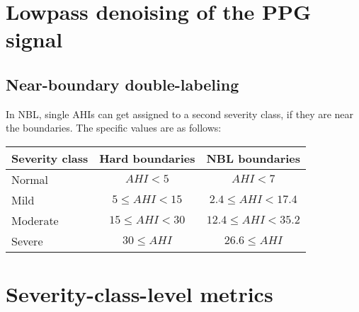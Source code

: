 \chapter{Lowpass denoising of the PPG signal}


\section{Near-boundary double-labeling}

In NBL, single AHIs can get assigned to a second severity class, if they are near the boundaries. The specific values are as follows:

\renewcommand{\arraystretch}{1.5}
\begin{table}[h!]
    \centering
    \begin{tabular}{ l c c }
        Severity class & Hard boundaries & NBL boundaries \\
        \hline
        Normal   & $ AHI < 5 $         & $ AHI < 7 $             \\
        Mild     & $ 5 \le AHI < 15 $  & $ 2.4 \le AHI < 17.4 $  \\
        Moderate & $ 15 \le AHI < 30 $ & $ 12.4 \le AHI < 35.2 $ \\
        Severe   & $ 30 \le AHI $      & $ 26.6 \le AHI $        \\
    \end{tabular}
\end{table}

\chapter{Severity-class-level metrics}

